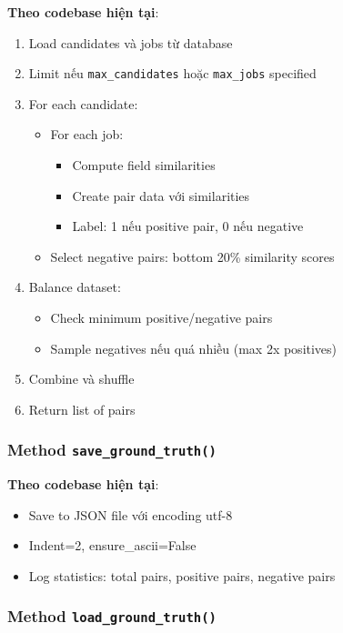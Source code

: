 \textbf{Theo codebase hiện tại}:

\begin{enumerate}
    \item Load candidates và jobs từ database
    \item Limit nếu \texttt{max\_candidates} hoặc \texttt{max\_jobs} specified
    \item For each candidate:
    \begin{itemize}
        \item For each job:
        \begin{itemize}
            \item Compute field similarities
            \item Create pair data với similarities
            \item Label: 1 nếu positive pair, 0 nếu negative
        \end{itemize}
        \item Select negative pairs: bottom 20\% similarity scores
    \end{itemize}
    \item Balance dataset:
    \begin{itemize}
        \item Check minimum positive/negative pairs
        \item Sample negatives nếu quá nhiều (max 2x positives)
    \end{itemize}
    \item Combine và shuffle
    \item Return list of pairs
\end{enumerate}

\subsubsection{Method \texttt{save\_ground\_truth()}}

\textbf{Theo codebase hiện tại}:

\begin{itemize}
    \item Save to JSON file với encoding utf-8
    \item Indent=2, ensure\_ascii=False
    \item Log statistics: total pairs, positive pairs, negative pairs
\end{itemize}

\subsubsection{Method \texttt{load\_ground\_truth()}}

